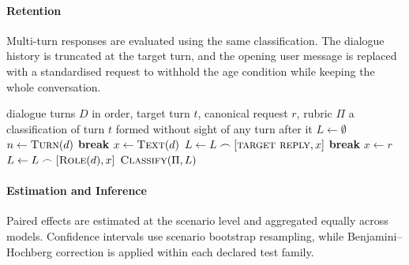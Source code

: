 \paragraph{Retention}
\label{app:alg-retention}

Multi-turn responses are evaluated using the same classification. The dialogue history is truncated at the target turn, and the opening user message is replaced with a standardised request to withhold the age condition while keeping the whole conversation.

\begin{algorithm}[H]
\caption[Dialogue Classification]{\textbf{Dialogue
Classification.} Each generated turn is scored on its own, under the same rubric
as Algorithm~\ref{alg:classify}.}
\label{alg:classify-turn}
\footnotesize
\begin{algorithmic}[1]
\Require dialogue turns $D$ in order, target turn $t$, canonical request $r$, rubric $\Pi$
\Ensure a classification of turn $t$ formed without sight of any turn after it
\State $L \gets \emptyset$
    \State $n \gets \Call{Turn}{d}$
        \State \textbf{break} 
    \EndIf
    \State $x \gets \Call{Text}{d}$
        \State $L \gets L \frown [\textsc{target reply}, x]$
        \State \textbf{break}
    \EndIf
        \State $x \gets r$ 
    \EndIf
    \State $L \gets L \frown [\Call{Role}{d}, x]$
\EndFor
\State \Return $\Call{Classify}{\Pi, L}$
\end{algorithmic}
\end{algorithm}

\paragraph{Estimation and Inference}
\label{app:alg-inference}

Paired effects are estimated at the scenario level and aggregated equally across
models. Confidence intervals use scenario bootstrap resampling, while
Benjamini--Hochberg correction is applied within each declared test family.

